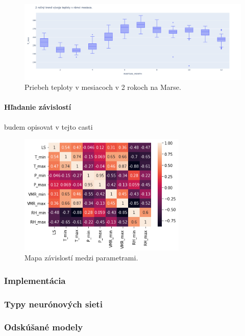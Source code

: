 \begin{figure}[!htbp]
  \centering
  \includegraphics[width=16cm]{img/monthly_temp.png}
  \caption{Priebeh teploty v mesiacoch v 2 rokoch na Marse.}
  \label{dfdesc}
\end{figure}


\newline

\paragraph{Hľadanie závislostí} budem opisovat v tejto casti
\begin{figure}[!htbp]
  \centering
  \includegraphics[width=8cm]{img/heatmap.png}
  \caption{Mapa závislostí medzi parametrami.}
  \label{heatmap}
\end{figure}


\newpage

\subsubsection{Implementácia}
\subsubsection{Typy neurónových sieti}
\subsubsection{Odskúšané modely}

